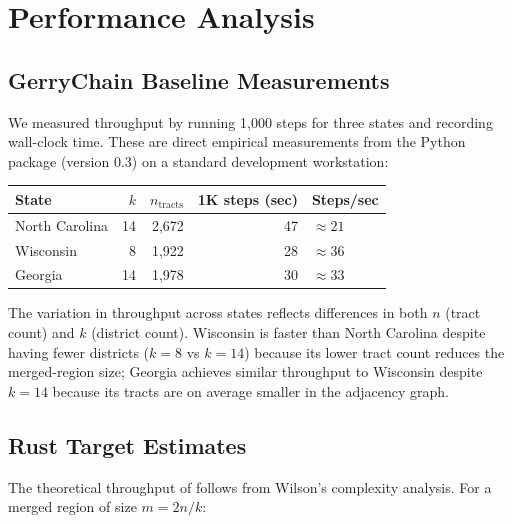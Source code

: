 \section{Performance Analysis}
\label{sec:performance}

\subsection{GerryChain Baseline Measurements}

We measured \gc{} throughput by running 1{,}000 \recom{} steps for
three states and recording wall-clock time.
These are direct empirical measurements from the \gc{} Python package
(version 0.3) on a standard development workstation:

\begin{center}
\begin{tabular}{lrrrl}
\toprule
State & $k$ & $n_{\text{tracts}}$ & 1K steps (sec) & Steps/sec \\
\midrule
North Carolina & 14 & 2{,}672 & 47 & $\approx 21$ \\
Wisconsin      &  8 & 1{,}922 & 28 & $\approx 36$ \\
Georgia        & 14 & 1{,}978 & 30 & $\approx 33$ \\
\bottomrule
\end{tabular}
\end{center}

The variation in throughput across states reflects differences in both
$n$ (tract count) and $k$ (district count).
Wisconsin is faster than North Carolina despite having fewer districts
($k=8$ vs $k=14$) because its lower tract count reduces the merged-region
size; Georgia achieves similar throughput to Wisconsin despite $k=14$
because its tracts are on average smaller in the adjacency graph.

\subsection{Rust Target Estimates}

The theoretical throughput of \re{} follows from Wilson's complexity
analysis.
For a merged region of size $m = 2n/k$:

